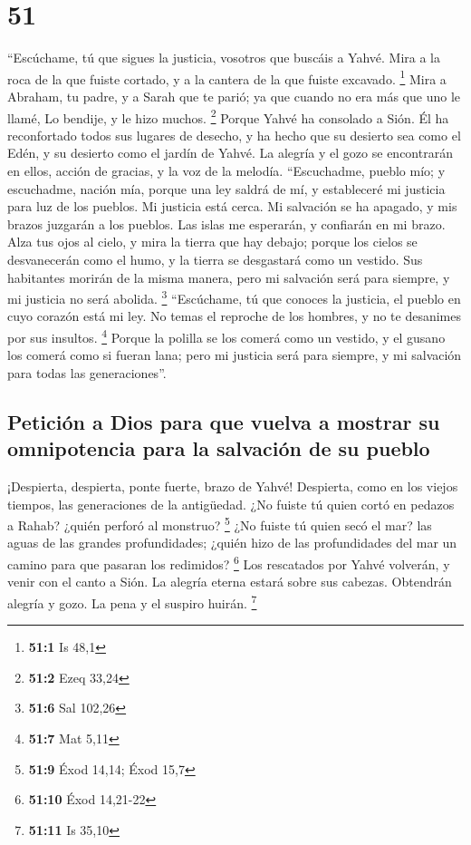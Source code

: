 \hypertarget{section-50}{%
\section{51}\label{section-50}}

 ``Escúchame, tú que sigues la justicia, vosotros que
buscáis a Yahvé. Mira a la roca de la que fuiste cortado, y a la cantera
de la que fuiste excavado. \footnote{\textbf{51:1} Is 48,1}
 Mira a Abraham, tu padre, y a Sarah que te parió; ya que
cuando no era más que uno le llamé, Lo bendije, y le hizo muchos.
\footnote{\textbf{51:2} Ezeq 33,24}  Porque Yahvé ha
consolado a Sión. Él ha reconfortado todos sus lugares de desecho, y ha
hecho que su desierto sea como el Edén, y su desierto como el jardín de
Yahvé. La alegría y el gozo se encontrarán en ellos, acción de gracias,
y la voz de la melodía.  ``Escuchadme, pueblo mío; y
escuchadme, nación mía, porque una ley saldrá de mí, y estableceré mi
justicia para luz de los pueblos.  Mi justicia está cerca.
Mi salvación se ha apagado, y mis brazos juzgarán a los pueblos. Las
islas me esperarán, y confiarán en mi brazo.  Alza tus
ojos al cielo, y mira la tierra que hay debajo; porque los cielos se
desvanecerán como el humo, y la tierra se desgastará como un vestido.
Sus habitantes morirán de la misma manera, pero mi salvación será para
siempre, y mi justicia no será abolida. \footnote{\textbf{51:6} Sal
  102,26}  ``Escúchame, tú que conoces la justicia, el
pueblo en cuyo corazón está mi ley. No temas el reproche de los hombres,
y no te desanimes por sus insultos. \footnote{\textbf{51:7} Mat 5,11}
 Porque la polilla se los comerá como un vestido, y el
gusano los comerá como si fueran lana; pero mi justicia será para
siempre, y mi salvación para todas las generaciones''.

\hypertarget{peticiuxf3n-a-dios-para-que-vuelva-a-mostrar-su-omnipotencia-para-la-salvaciuxf3n-de-su-pueblo}{%
\subsection{Petición a Dios para que vuelva a mostrar su omnipotencia
para la salvación de su
pueblo}\label{peticiuxf3n-a-dios-para-que-vuelva-a-mostrar-su-omnipotencia-para-la-salvaciuxf3n-de-su-pueblo}}

 ¡Despierta, despierta, ponte fuerte, brazo de Yahvé!
Despierta, como en los viejos tiempos, las generaciones de la
antigüedad. ¿No fuiste tú quien cortó en pedazos a Rahab? ¿quién perforó
al monstruo? \footnote{\textbf{51:9} Éxod 14,14; Éxod 15,7}
 ¿No fuiste tú quien secó el mar? las aguas de las
grandes profundidades; ¿quién hizo de las profundidades del mar un
camino para que pasaran los redimidos? \footnote{\textbf{51:10} Éxod
  14,21-22}  Los rescatados por Yahvé volverán, y venir
con el canto a Sión. La alegría eterna estará sobre sus cabezas.
Obtendrán alegría y gozo. La pena y el suspiro huirán. \footnote{\textbf{51:11}
  Is 35,10}

